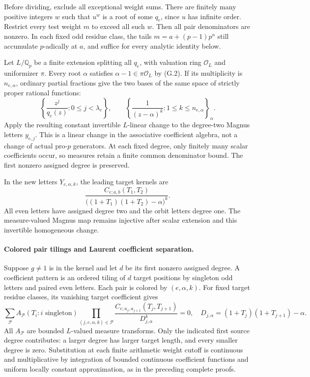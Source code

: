 Before dividing, exclude all exceptional weight sums. There are finitely many positive integers $w$ such that $u^w$ is a root of some $q_e$, since $u$ has infinite order. Restrict every test weight $m$ to exceed all such $w$. Then all pair denominators are nonzero. In each fixed odd residue class, the tails $m=a+(p-1)p^n$ still accumulate $p$-adically at $a$, and suffice for every analytic identity below.

Let $L/\mathbb Q_p$ be a finite extension splitting all $q_e$, with valuation ring $\mathcal O_L$ and uniformizer $\pi$. Every root $\alpha$ satisfies $\alpha-1\in\pi\mathcal O_L$ by (G.2). If its multiplicity is $n_{e,\alpha}$, ordinary partial fractions give the two bases of the same space of strictly proper rational functions:
\[
 \left\{\frac{z^j}{q_e(z)}:0\le j<\lambda_e\right\},
 \qquad
 \left\{\frac1{(z-\alpha)^k}:1\le k\le n_{e,\alpha}\right\}_{\alpha}.
\]
Apply the resulting constant invertible $L$-linear change to the degree-two Magnus letters $y_{e,j}$. This is a linear change in the associative coefficient algebra, not a change of actual pro-$p$ generators. At each fixed degree, only finitely many scalar coefficients occur, so measures retain a finite common denominator bound. The first nonzero assigned degree is preserved.

In the new letters $Y_{e,\alpha,k}$, the leading target kernels are
\[
 \frac{C_{e;a,b}(T_1,T_2)}
      {\bigl((1+T_1)(1+T_2)-\alpha\bigr)^k}.                   \tag{G.8}
\]
All even letters have assigned degree two and the orbit letters degree one. The measure-valued Magnus map remains injective after scalar extension and this invertible homogeneous change.

\paragraph{Colored pair tilings and Laurent coefficient separation.}
Suppose $g\ne1$ is in the kernel and let $d$ be its first nonzero assigned degree. A coefficient pattern is an ordered tiling of $d$ target positions by singleton odd letters and paired even letters. Each pair is colored by $(e,\alpha,k)$. For fixed target residue classes, its vanishing target coefficient gives
\[
 \sum_{\mathcal P} A_{\mathcal P}(T_i:i\text{ singleton})
 \prod_{(j,e,\alpha,k)\in\mathcal P}
 \frac{C_{e;a_j,a_{j+1}}(T_j,T_{j+1})}{D_{j,\alpha}^k}=0,
 \quad D_{j,\alpha}=(1+T_j)(1+T_{j+1})-\alpha.                \tag{G.9}
\]
All $A_{\mathcal P}$ are bounded $L$-valued measure transforms. Only the indicated first source degree contributes: a larger degree has larger target length, and every smaller degree is zero. Substitution at each finite arithmetic weight cutoff is continuous and multiplicative by integration of bounded continuous coefficient functions and uniform locally constant approximation, as in the preceding complete proofs.

